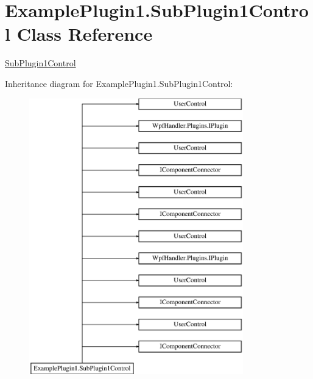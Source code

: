 \hypertarget{class_example_plugin1_1_1_sub_plugin1_control}{}\section{Example\+Plugin1.\+Sub\+Plugin1\+Control Class Reference}
\label{class_example_plugin1_1_1_sub_plugin1_control}


\mbox{\hyperlink{class_example_plugin1_1_1_sub_plugin1_control}{Sub\+Plugin1\+Control}}  


Inheritance diagram for Example\+Plugin1.\+Sub\+Plugin1\+Control\+:\begin{figure}[H]
\begin{center}
\leavevmode
\includegraphics[height=12.000000cm]{df/d40/class_example_plugin1_1_1_sub_plugin1_control}
\end{center}
\end{figure}

